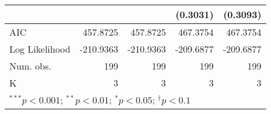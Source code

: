 \begin{tabular}{l D{.}{.}{4.5} D{.}{.}{4.5} D{.}{.}{4.5} D{.}{.}{4.5}}
                                  &           &           & (0.3031)  & (0.3093)  \\
\midrule
AIC                               & 457.8725  & 457.8725  & 467.3754  & 467.3754  \\
Log Likelihood                    & -210.9363 & -210.9363 & -209.6877 & -209.6877 \\
Num. obs.                         & 199       & 199       & 199       & 199       \\
K                                 & 3         & 3         & 3         & 3         \\
\bottomrule
{}
\end{tabular}
